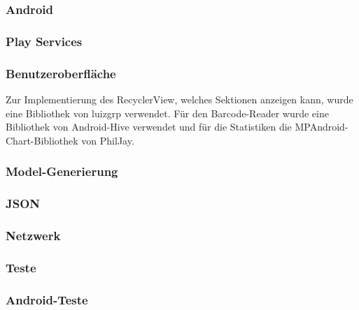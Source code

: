 \subsubsection{Android}

\subsubsection{Play Services}

\subsubsection{Benutzeroberfläche}
Zur Implementierung des RecyclerView, welches Sektionen anzeigen kann, wurde eine Bibliothek von luizgrp verwendet.
Für den Barcode-Reader wurde eine Bibliothek von Android-Hive verwendet und für die Statistiken die MPAndroid-Chart-Bibliothek von PhilJay.

\subsubsection{Model-Generierung}

\subsubsection{JSON}

\subsubsection{Netzwerk}

\subsubsection{Teste}

\subsubsection{Android-Teste}
